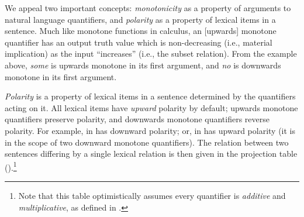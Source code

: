 We appeal two important concepts: \textit{monotonicity} as a
  property of arguments to natural language quantifiers,
  and \textit{polarity}
  as a property of lexical items in a sentence.
Much like monotone functions in calculus,
  an [upwards] monotone quantifier has an output truth value which is
  non-decreasing (i.e., material implication)
  as the input ``increases'' (i.e., the subset relation).
From the example above, \textit{some} is upwards monotone in its first
  argument, and \textit{no} is downwards monotone in its first argument.

%

\textit{Polarity} is
  a property of lexical items in a sentence determined by the
  quantifiers acting on it.
All lexical items have \textit{upward} polarity by default;
  upwards monotone quantifiers preserve polarity,
  and downwards monotone quantifiers reverse polarity.
For example,  in  has downward polarity; or,
   in  has upward polarity
  (it is in the scope of two downward monotone quantifiers).
The relation between two sentences differing by a single lexical
  relation is then given in the projection table
  ().\footnote{
    Note that this table optimistically assumes every quantifier is
    \textit{additive} and \textit{multiplicative}, as defined
    in .
  }


